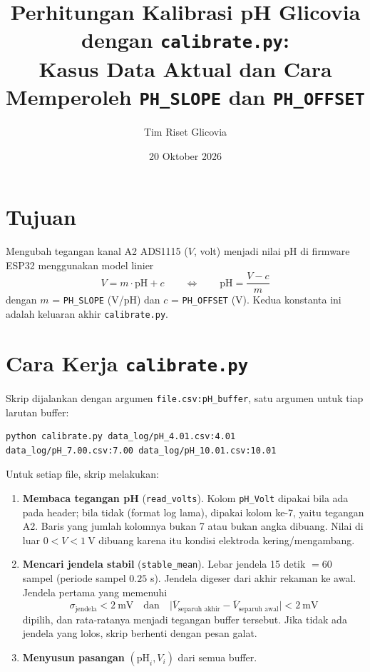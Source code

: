 \documentclass[12pt,a4paper]{article}
\title{\textbf{Perhitungan Kalibrasi pH Glicovia dengan \texttt{calibrate.py}:\\Kasus Data Aktual dan Cara Memperoleh \texttt{PH\_SLOPE} dan \texttt{PH\_OFFSET}}}
\author{Tim Riset Glicovia}
\date{20 Oktober 2026}
\begin{document}
\maketitle

\section{Tujuan}

Mengubah tegangan kanal A2 ADS1115 ($V$, volt) menjadi nilai pH di firmware ESP32 menggunakan model linier
\begin{equation}
V = m \cdot \text{pH} + c \qquad\Longleftrightarrow\qquad \text{pH} = \frac{V - c}{m}
\end{equation}
dengan $m$ = \texttt{PH\_SLOPE} (V/pH) dan $c$ = \texttt{PH\_OFFSET} (V). Kedua konstanta ini adalah keluaran akhir \texttt{calibrate.py}.

\section{Cara Kerja \texttt{calibrate.py}}

Skrip dijalankan dengan argumen \texttt{file.csv:pH\_buffer}, satu argumen untuk tiap larutan buffer:
\begin{lstlisting}
python calibrate.py data_log/pH_4.01.csv:4.01 data_log/pH_7.00.csv:7.00 data_log/pH_10.01.csv:10.01
\end{lstlisting}

Untuk setiap file, skrip melakukan:
\begin{enumerate}
    \item \textbf{Membaca tegangan pH} (\texttt{read\_volts}). Kolom \texttt{pH\_Volt} dipakai bila ada pada header; bila tidak (format log lama), dipakai kolom ke-7, yaitu tegangan A2. Baris yang jumlah kolomnya bukan 7 atau bukan angka dibuang. Nilai di luar $0 < V < 1\ \text{V}$ dibuang karena itu kondisi elektroda kering/mengambang.
    \item \textbf{Mencari jendela stabil} (\texttt{stable\_mean}). Lebar jendela 15 detik $= 60$ sampel (periode sampel $0.25$ s). Jendela digeser dari akhir rekaman ke awal. Jendela pertama yang memenuhi
    \begin{equation}
    \sigma_{\text{jendela}} < 2\ \text{mV} \quad\text{dan}\quad \bigl|\overline{V}_{\text{separuh akhir}} - \overline{V}_{\text{separuh awal}}\bigr| < 2\ \text{mV}
    \end{equation}
    dipilih, dan rata-ratanya menjadi tegangan buffer tersebut. Jika tidak ada jendela yang lolos, skrip berhenti dengan pesan galat.
    \item \textbf{Menyusun pasangan} $(\text{pH}_i, V_i)$ dari semua buffer.
\end{enumerate}
\end{document}

